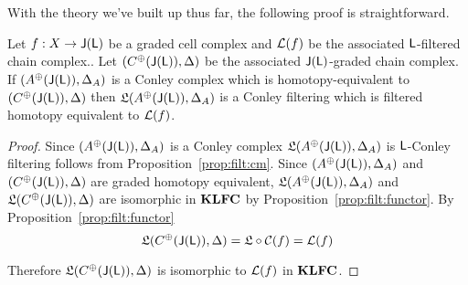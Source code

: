 With the theory we've built up thus far, the following proof is straightforward.

\begin{thm}
Let $f:X\to {\mathsf J}({\mathsf L})$ be a graded cell complex and ${\mathcal L}(f)$ be the associated ${\mathsf L}$-filtered chain complex..  Let $(C^\oplus({\mathsf J}({\mathsf L})),\Delta)$ be the associated ${\mathsf J}({\mathsf L})$-graded chain complex.  If $(A^\oplus({\mathsf J}({\mathsf L})),\Delta_A)$ is a Conley complex which is homotopy-equivalent to $(C^\oplus({\mathsf J}({\mathsf L})),\Delta)$ then $\mathfrak{L}(A^\oplus({\mathsf J}({\mathsf L})),\Delta_A)$ is a Conley filtering which is filtered homotopy equivalent to ${\mathcal L}(f)$.
\end{thm}

\begin{proof}
Since $(A^\oplus({\mathsf J}({\mathsf L})),\Delta_A)$ is a Conley complex $\mathfrak{L}(A^\oplus({\mathsf J}({\mathsf L})),\Delta_A)$ is ${\mathsf L}$-Conley filtering follows from Proposition~\ref{prop:filt:cm}.  Since $(A^\oplus({\mathsf J}({\mathsf L})),\Delta_A)$ and $(C^\oplus({\mathsf J}({\mathsf L})),\Delta)$ are graded homotopy equivalent, $\mathfrak{L}(A^\oplus({\mathsf J}({\mathsf L})),\Delta_A)$ and $\mathfrak{L}(C^\oplus({\mathsf J}({\mathsf L})),\Delta)$ are isomorphic in ${\bf KLFC}$ by Proposition~\ref{prop:filt:functor}.  By Proposition~\ref{prop:filt:functor} 
\[
\mathfrak{L}(C^\oplus({\mathsf J}({\mathsf L})),\Delta) = \mathfrak{L}\circ {\mathcal C}(f) = {\mathcal L}(f)
\]

Therefore $\mathfrak{L}(C^\oplus({\mathsf J}({\mathsf L})),\Delta)$ is isomorphic to ${\mathcal L}(f)$ in ${\bf KLFC}$.

\end{proof}









